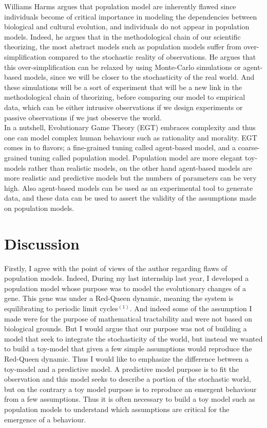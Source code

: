 \documentclass[10pt]{article}
\begin{document}
Williams Harms argues that population model are inherently flawed since individuals become of critical importance in modeling the dependencies between biological and cultural evolution, and individuals do not appear in population models. Indeed, he argues that in the methodological chain of our scientific theorizing, the most abstract models such as population models suffer from over-simplification compared to the stochastic reality of observations. He argues that this over-simplification can be relaxed by using Monte-Carlo simulations or agent-based models, since we will be closer to the stochasticity of the real world. And these simulations will be a sort of experiment that will be a new link in the methodological chain of theorizing, before comparing our model to empirical data, which can be either intrusive observations if we design experiments or passive observations if we just obeserve the world. \\

In a nutshell, Evolutionary Game Theory (EGT) embraces complexity and thus one can model complex human behaviour such as rationality and morality. EGT comes in to flavors; a fine-grained tuning called agent-based model, and a coarse-grained tuning called population model. Population model are more elegant toy-models rather than realistic models, on the other hand agent-based models are more realistic and predictive models but the numbers of parameters can be very high. Also agent-based models can be used as an experimental tool to generate data, and these data can be used to assert the validity of the assumptions made on population models. \\



\section*{Discussion}

Firstly, I agree with the point of views of the author regarding flaws of population models. Indeed, During my last internship last year, I developed a population model whose purpose was to model the evolutionary changes of a gene. This gene was under a Red-Queen dynamic, meaning the system is equilibrating to periodic limit cycles$^{(1)}$. And indeed some of the assumption I made were for the purpose of mathematical tractability and were not based on biological grounds. But I would argue that our purpose was not of building a model that seek to integrate the stochasticity of the world, but instead we wanted to build a toy-model that given a few simple assumptions would reproduce the Red-Queen dynamic. Thus I would like to emphasize the difference between a toy-model and a predictive model. A predictive model purpose is to fit the observation and this model seeks to describe a portion of the stochastic world, but on the contrary a toy model purpose is to reproduce an emergent behaviour from a few assumptions. Thus it is often necessary to build a toy model such as population models to understand which assumptions are critical for the emergence of a behaviour. \\
\end{document}
